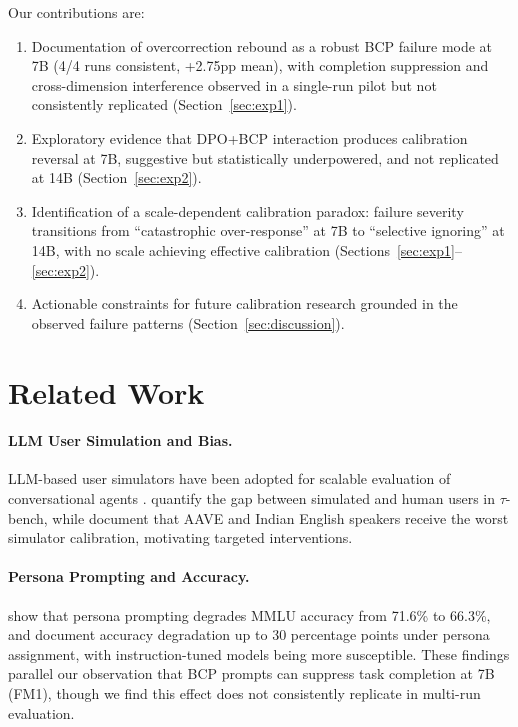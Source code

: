 \documentclass[11pt]{article}
\begin{document}
Our contributions are:
\begin{enumerate}
    \item[\textbf{C1.}] Documentation of overcorrection rebound as a robust BCP failure mode at 7B (4/4 runs consistent, +2.75pp mean), with completion suppression and cross-dimension interference observed in a single-run pilot but not consistently replicated (Section~\ref{sec:exp1}).
    \item[\textbf{C2.}] Exploratory evidence that DPO+BCP interaction produces calibration reversal at 7B, suggestive but statistically underpowered, and not replicated at 14B (Section~\ref{sec:exp2}).
    \item[\textbf{C3.}] Identification of a scale-dependent calibration paradox: failure severity transitions from ``catastrophic over-response'' at 7B to ``selective ignoring'' at 14B, with no scale achieving effective calibration (Sections~\ref{sec:exp1}--\ref{sec:exp2}).
    \item[\textbf{C4.}] Actionable constraints for future calibration research grounded in the observed failure patterns (Section~\ref{sec:discussion}).
\end{enumerate}

\section{Related Work}
\label{sec:related}

\paragraph{LLM User Simulation and Bias.}
LLM-based user simulators have been adopted for scalable evaluation of conversational agents \citep{yao2024taubench}.
\citet{sim2real2026gap} quantify the gap between simulated and human users in $\tau$-bench, while \citet{seshadri2026lost} document that AAVE and Indian English speakers receive the worst simulator calibration, motivating targeted interventions.

\paragraph{Persona Prompting and Accuracy.}
\citet{basil2025playing_pretend} show that persona prompting degrades MMLU accuracy from 71.6\% to 66.3\%, and \citet{hu2026expert_persona} document accuracy degradation up to 30 percentage points under persona assignment, with instruction-tuned models being more susceptible.
These findings parallel our observation that BCP prompts can suppress task completion at 7B (FM1), though we find this effect does not consistently replicate in multi-run evaluation.
\end{document}

